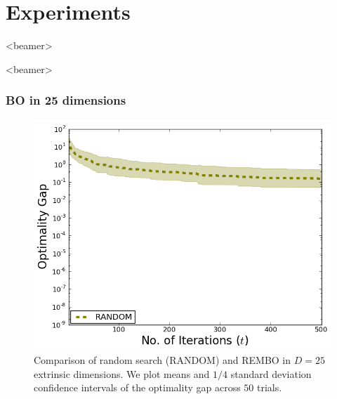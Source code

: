 \documentclass[grey]{beamer}
\begin{document}
 \section{Experiments}
 \begin{frame}<beamer>
  \tableofcontents[currentsection]
 \end{frame}
 

 
 \begin{frame}<beamer>
  \frametitle{BO in 25 dimensions}
  
  \begin{figure}
   \includegraphics[width=0.6\columnwidth]{./figs/branin_dis1.png}
    \caption{Comparison of random search (RANDOM) and REMBO
     in $D=25$ extrinsic dimensions. 
     We plot means and $1/4$ standard deviation confidence intervals of the optimality gap across $50$ trials.}
   \label{fig:standard}
  \end{figure}
 \end{frame}
 
\end{document}
